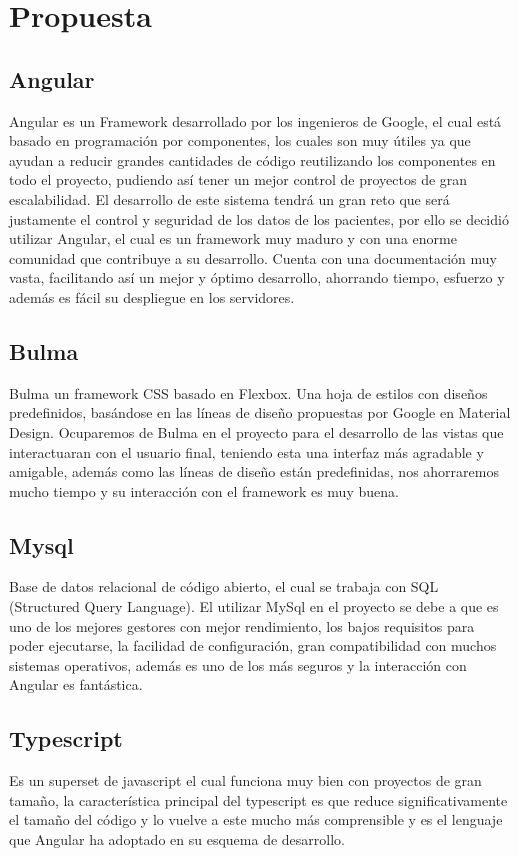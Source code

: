 \chapter{Propuesta}

\section{Angular }
Angular es un Framework desarrollado por los ingenieros de Google, el cual está basado en programación por componentes, los cuales son muy útiles ya que ayudan a reducir grandes cantidades de código reutilizando los componentes en todo el proyecto, pudiendo así tener un mejor control de proyectos de gran escalabilidad. El desarrollo de este sistema tendrá un gran reto que será justamente el control y seguridad de los datos de los pacientes, por ello se decidió utilizar Angular, el cual es un framework muy maduro y con una enorme comunidad que contribuye a su desarrollo. Cuenta con una documentación muy vasta, facilitando así un mejor y óptimo desarrollo, ahorrando tiempo, esfuerzo y además es fácil su despliegue en los servidores.

\section{Bulma}
Bulma un framework CSS basado en Flexbox. Una hoja de estilos con diseños predefinidos, basándose en las líneas de diseño propuestas por Google en Material Design.
Ocuparemos de Bulma en el proyecto para el desarrollo de las vistas que interactuaran con el usuario final, teniendo esta una interfaz más agradable y amigable, además como las líneas de diseño están predefinidas, nos ahorraremos mucho tiempo y su interacción con el framework es muy buena.

\section{ Mysql}
Base de datos relacional de código abierto, el cual se trabaja con SQL (Structured Query Language).
El utilizar MySql en el proyecto se debe a que es uno de los mejores gestores con mejor rendimiento, los bajos requisitos para poder ejecutarse, la facilidad de configuración, gran compatibilidad con muchos sistemas operativos, además es uno de los más seguros y la interacción con Angular es fantástica.

\section{Typescript}
Es un superset de javascript el cual funciona muy bien con proyectos de gran tamaño, la característica principal del typescript es que reduce significativamente el tamaño del código y lo vuelve a este mucho más comprensible y es el lenguaje que Angular ha adoptado en su esquema de desarrollo.

